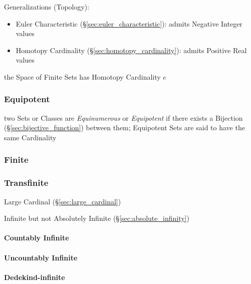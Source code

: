 Generalizations (Topology):

\begin{itemize}
  \item Euler Characteristic (\S\ref{sec:euler_characteristic}):
    admits Negative Integer values
  \item Homotopy Cardinality (\S\ref{sec:homotopy_cardinality}):
    admits Positive Real values
\end{itemize}

the Space of Finite Sets has Homotopy Cardinality $e$



\subsubsection{Equipotent}\label{sec:equipotent}

two Sets or Classes are \emph{Equinumerous} or \emph{Equipotent} if there exists
a Bijection (\S\ref{sec:bijective_function}) between them; Equipotent Sets are
said to have the same Cardinality



\subsubsection{Finite}\label{sec:finite_cardinality}

\subsubsection{Transfinite}\label{sec:transfinite}

Large Cardinal (\S\ref{sec:large_cardinal})

Infinite but not Absolutely Infinite (\S\ref{sec:absolute_infinity})



\paragraph{Countably Infinite}\label{sec:countably_infinite}\hfill

\paragraph{Uncountably Infinite}\label{sec:uncountably_infinite}\hfill

\paragraph{Dedekind-infinite}\label{sec:dedekind_infinite}\hfill



